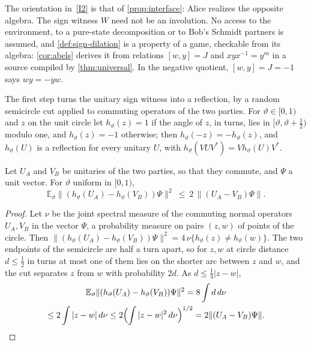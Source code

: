 The orientation in~\ref{I2} is that of \cref{prop:interface}: Alice realizes the opposite algebra. The sign witness $W$ need not be
an involution. No access to the environment, to a pure-state decomposition or to Bob's Schmidt partners is assumed, and
\cref{def:sign-dilation} is a property of a game, checkable from its algebra: \cref{cor:abels} derives it from relations
$[w,y]=J$ and $xyx^{-1}=y^m$ in a source compiled by \cref{thm:universal}. In the negative quotient, $[w,y]=J=-1$ says
$wy=-yw$.

The first step turns the unitary sign witness into a reflection, by a random semicircle cut applied to commuting operators of
the two parties. For $\vartheta\in[0,1)$ and $z$ on the unit circle let $h_\vartheta(z)=1$ if the angle of $z$, in turns, lies in
$[\vartheta,\vartheta+\frac12)$ modulo one, and $h_\vartheta(z)=-1$ otherwise; then $h_\vartheta(-z)=-h_\vartheta(z)$, and
$h_\vartheta(U)$ is a reflection for every unitary $U$, with $h_\vartheta(VUV^*)=Vh_\vartheta(U)V^*$.

\begin{lemma}\label{lem:cut-parties}
Let $U_A$ and $V_B$ be unitaries of the two parties, so that they commute, and $\Psi$ a unit vector. For $\vartheta$ uniform in
$[0,1)$,
\[
\mathbb E_\vartheta\|(h_\vartheta(U_A)-h_\vartheta(V_B))\Psi\|^2\ \le\ 2\,\|(U_A-V_B)\Psi\| .
\]
\end{lemma}

\begin{proof}
Let $\nu$ be the joint spectral measure of the commuting normal operators $U_A,V_B$ in the vector $\Psi$, a probability measure on
pairs $(z,w)$ of points of the circle. Then $\|(h_\vartheta(U_A)-h_\vartheta(V_B))\Psi\|^2=4\,\nu\{h_\vartheta(z)\ne h_\vartheta(w)\}$. The two
endpoints of the semicircle are half a turn apart, so for $z,w$ at circle distance $d\le\frac12$ in turns at most one of them lies
on the shorter arc between $z$ and $w$, and the cut separates $z$ from $w$ with probability $2d$. As $d\le\frac14|z-w|$,
\begin{multline*}
\mathbb E_\vartheta\|(h_\vartheta(U_A)-h_\vartheta(V_B))\Psi\|^2=8\int d\,d\nu\\
\le2\int|z-w|\,d\nu\le2\Bigl(\int|z-w|^2\,d\nu\Bigr)^{1/2}=2\|(U_A-V_B)\Psi\|.
\end{multline*}
\end{proof}

